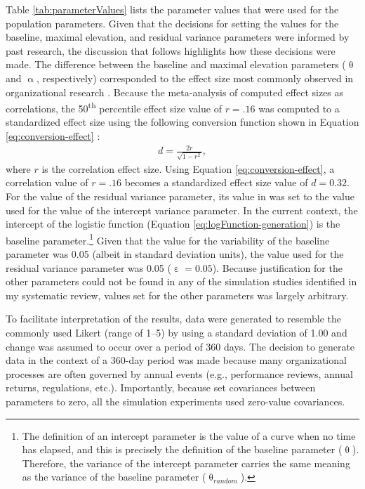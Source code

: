 \documentclass[
12pt, %
twoside,
english]{guelphthesis}
\begin{document}
Table \ref{tab:parameterValues} lists the parameter values that were used for the population parameters. Given that the decisions for setting the values for the baseline, maximal elevation, and residual variance parameters were informed by past research, the discussion that follows highlights how these decisions were made. The difference between the baseline and maximal elevation parameters (\(\uptheta\) and \(\upalpha\), respectively) corresponded to the effect size most commonly observed in organizational research \autocite[i.e., the 50\textsuperscript{th} percentile effect size value;][]{bosco2015}. Because the meta-analysis of \textcite{bosco2015} computed effect sizes as correlations, the 50\textsuperscript{th} percentile effect size value of \(r = .16\) was computed to a standardized effect size using the following conversion function shown in Equation \ref{eq:conversion-effect} \autocite[Chapter 7]{borenstein2009}:
\begin{align}
d = \frac{2r}{\sqrt{1 - r^2}}, 
\label{eq:conversion-effect}
\end{align}
\noindent where \(r\) is the correlation effect size. Using Equation \ref{eq:conversion-effect}, a correlation value of \(r = .16\) becomes a standardized effect size value of \(d = 0.32\). For the value of the residual variance parameter, its value in \textcite{coulombe2016} was set to the value used for the value of the intercept variance parameter. In the current context, the intercept of the logistic function (Equation \ref{eq:logFunction-generation}) is the baseline parameter.\footnote{The definition of an intercept parameter is the value of a curve when no time has elapsed, and this is precisely the definition of the baseline parameter ($\uptheta$). Therefore, the variance of the intercept parameter carries the same meaning as the variance of the baseline parameter ($\uptheta_{random}$).} Given that the value for the variability of the baseline parameter was 0.05 (albeit in standard deviation units), the value used for the residual variance parameter was 0.05 (\(\upepsilon = 0.05\)). Because justification for the other parameters could not be found in any of the simulation studies identified in my systematic review, values set for the other parameters was largely arbitrary.

To facilitate interpretation of the results, data were generated to resemble the commonly used Likert (range of 1--5) by using a standard deviation of 1.00 and change was assumed to occur over a
period of 360 days. The decision to generate data in the context of a
360-day period was made because many organizational processes are often
governed by annual events (e.g., performance reviews, annual returns,
regulations, etc.). Importantly, because \textcite{coulombe2016} set covariances
between parameters to zero, all the simulation experiments used
zero-value covariances.
\end{document}
